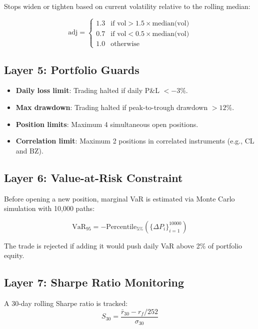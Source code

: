 \documentclass[12pt,a4paper]{article}
\begin{document}
Stops widen or tighten based on current volatility relative to the rolling median:

\begin{equation}
    \text{adj} = \begin{cases}
        1.3 & \text{if vol} > 1.5 \times \text{median(vol)} \\
        0.7 & \text{if vol} < 0.5 \times \text{median(vol)} \\
        1.0 & \text{otherwise}
    \end{cases}
\end{equation}

\subsection{Layer 5: Portfolio Guards}

\begin{itemize}[leftmargin=*]
    \item \textbf{Daily loss limit}: Trading halted if daily P\&L $< -3\%$.
    \item \textbf{Max drawdown}: Trading halted if peak-to-trough drawdown $> 12\%$.
    \item \textbf{Position limits}: Maximum 4 simultaneous open positions.
    \item \textbf{Correlation limit}: Maximum 2 positions in correlated instruments (e.g., CL and BZ).
\end{itemize}

\subsection{Layer 6: Value-at-Risk Constraint}

Before opening a new position, marginal VaR is estimated via Monte Carlo simulation with 10{,}000 paths:

\begin{equation}
    \text{VaR}_{95} = -\text{Percentile}_{5\%}\!\left(\{\Delta P_i\}_{i=1}^{10000}\right)
\end{equation}

The trade is rejected if adding it would push daily VaR above 2\% of portfolio equity.

\subsection{Layer 7: Sharpe Ratio Monitoring}

A 30-day rolling Sharpe ratio is tracked:
\begin{equation}
    S_{30} = \frac{\bar{r}_{30} - r_f / 252}{\sigma_{30}}
\end{equation}
\end{document}
